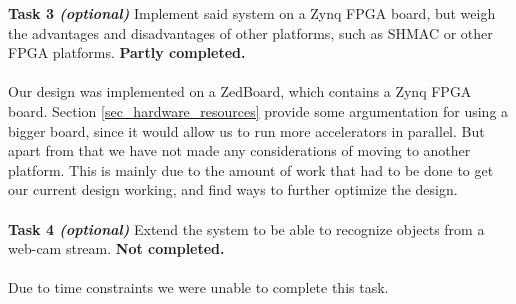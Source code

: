 \textbf{Task 3 \textit{(optional)}} Implement said system on a  Zynq FPGA board, but weigh the advantages and disadvantages of other platforms, such as SHMAC or other FPGA platforms. \textbf{Partly completed.} \\ \hfil \\ \hfil
Our design was implemented on a ZedBoard, which contains a Zynq FPGA board. Section \ref{sec_hardware_resources} provide some argumentation for using a bigger board, since it would allow us to run more accelerators in parallel. But apart from that we have not made any considerations of moving to another platform. This is mainly due to the amount of work that had to be done to get our current design working, and find ways to further optimize the design.  \\ \hfil \\ \hfil
\textbf{Task 4 \textit{(optional)}} Extend the system to be able to recognize objects from a web-cam stream. \textbf{Not completed.} \\ \hfil \\ \hfil
Due to time constraints we were unable to complete this task. 